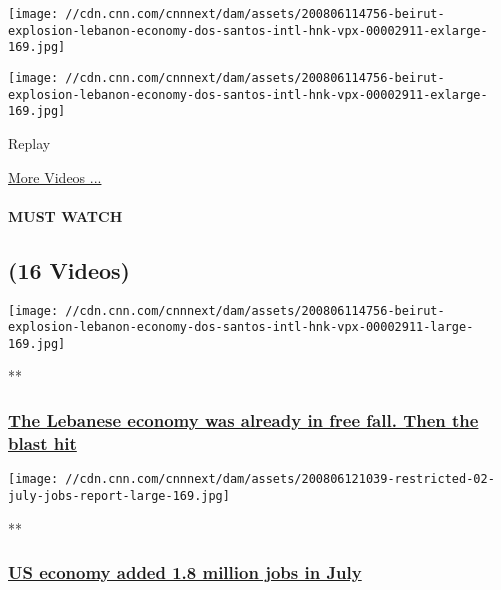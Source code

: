 \texttt{[image: //cdn.cnn.com/cnnnext/dam/assets/200806114756-beirut-explosion-lebanon-economy-dos-santos-intl-hnk-vpx-00002911-exlarge-169.jpg]}

\texttt{[image: //cdn.cnn.com/cnnnext/dam/assets/200806114756-beirut-explosion-lebanon-economy-dos-santos-intl-hnk-vpx-00002911-exlarge-169.jpg]}\href{javascript:void(0);}{}

Replay

\href{/videos}{More Videos ...}

\hypertarget{must-watch}{%
\paragraph{MUST WATCH}\label{must-watch}}

\hypertarget{16-videos}{%
\subsection{(16 Videos)}\label{16-videos}}

\href{/videos/business/2020/08/06/beirut-explosion-lebanon-economy-dos-santos-intl-hnk-vpx.cnn/video/playlists/business-economy/}{}

\texttt{[image: //cdn.cnn.com/cnnnext/dam/assets/200806114756-beirut-explosion-lebanon-economy-dos-santos-intl-hnk-vpx-00002911-large-169.jpg]}

**

\hypertarget{the-lebanese-economy-was-already-in-free-fall-then-the-blast-hit}{%
\subsubsection{\texorpdfstring{\href{/videos/business/2020/08/06/beirut-explosion-lebanon-economy-dos-santos-intl-hnk-vpx.cnn/video/playlists/business-economy/}{The
Lebanese economy was already in free fall. Then the blast
hit}}{The Lebanese economy was already in free fall. Then the blast hit}}\label{the-lebanese-economy-was-already-in-free-fall-then-the-blast-hit}}

\href{/videos/business/2020/08/07/july-jobs-report.cnnbusiness/video/playlists/business-economy/}{}

\texttt{[image: //cdn.cnn.com/cnnnext/dam/assets/200806121039-restricted-02-july-jobs-report-large-169.jpg]}

**

\hypertarget{us-economy-added-18-million-jobs-in-july}{%
\subsubsection{\texorpdfstring{\href{/videos/business/2020/08/07/july-jobs-report.cnnbusiness/video/playlists/business-economy/}{US
economy added 1.8 million jobs in
July}}{US economy added 1.8 million jobs in July}}\label{us-economy-added-18-million-jobs-in-july}}

